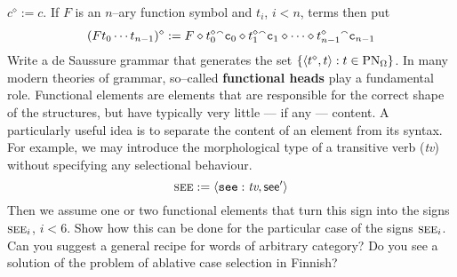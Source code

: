 $c^{\diamond} := c$. If $F$ is an $n$--ary function symbol and 
$t_i$, $i < n$, terms then put
\begin{equation}
(Ft_0\dotsb t_{n-1})^{\diamond} := F\diamond
    t_0^{\diamond}{^{\smallfrown}} \mbox{\tt c}_0 \diamond
    t_1^{\diamond}{^{\smallfrown}} \mbox{\tt c}_1 \diamond
    \dotsb \diamond
    t_{n-1}^{\diamond}{^{\smallfrown}} \mbox{\tt c}_{n-1}
\end{equation}
Write a de Saussure grammar that generates the set 
$\{\langle t^{\diamond}, t\rangle : t \in \operatorname{PN}_{\Omega}\}$.
\vplatz
\exercise
In many modern theories of grammar, so--called \textbf{functional
heads} play a fundamental role. Functional elements are
elements that are responsible for the correct shape of the
structures, but have typically very little --- if any --- content.
A particularly useful idea is to separate the content of an
element from its syntax. For example, we may introduce
the morphological type of a transitive verb ({\it tv\/})
without specifying any selectional behaviour.
\begin{equation}
\mbox{\sc see} := \langle \mbox{\tt see} : \mbox{\it tv},
    \mbox{\sf see}'\rangle
\end{equation}
Then we assume one or two functional elements that turn this sign
into the signs $\mbox{\sc see}_i$, $i < 6$. Show how this can
be done for the particular case of the signs $\mbox{\sc see}_i$.
Can you suggest a general recipe for words of arbitrary category?
Do you see a solution of the problem of ablative case selection 
in Finnish?
